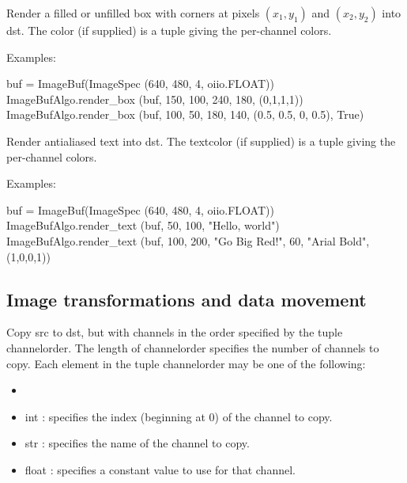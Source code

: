  
\NEW %

Render a filled or unfilled box with corners at pixels $(x_1,y_1)$ and
$(x_2,y_2)$ into {\cf dst}.  The {\cf color} (if supplied) is a tuple giving
the per-channel colors.

\smallskip
\noindent Examples:
\begin{code}
    buf = ImageBuf(ImageSpec (640, 480, 4, oiio.FLOAT))
    ImageBufAlgo.render_box (buf, 150, 100, 240, 180, (0,1,1,1))
    ImageBufAlgo.render_box (buf, 100, 50, 180, 140, (0.5, 0.5, 0, 0.5), True)
\end{code}
\apiend


 

Render antialiased text into {\cf dst}.  The {\cf textcolor} (if supplied)
is a tuple giving the per-channel colors.

\smallskip
\noindent Examples:
\begin{code}
    buf = ImageBuf(ImageSpec (640, 480, 4, oiio.FLOAT))
    ImageBufAlgo.render_text (buf, 50, 100, "Hello, world")
    ImageBufAlgo.render_text (buf, 100, 200, "Go Big Red!",
                               60, "Arial Bold", (1,0,0,1))
\end{code}
\apiend



\subsection{Image transformations and data movement}
\label{sec:iba:py:transforms}

 

Copy {\cf src} to {\cf dst}, but with channels in
the order specified by the tuple {\cf channelorder}. 
The length of {\cf channelorder} specifies the number of channels to copy.
Each element in the tuple {\cf channelorder} may be one of the following:
\begin{itemize}
\item {}
\item {\cf int} : specifies the index (beginning at 0) of the channel
    to copy.
\item {\cf str} : specifies the name of the channel to copy.
\item {\cf float} : specifies a constant value to use for that channel.
\end{itemize}

